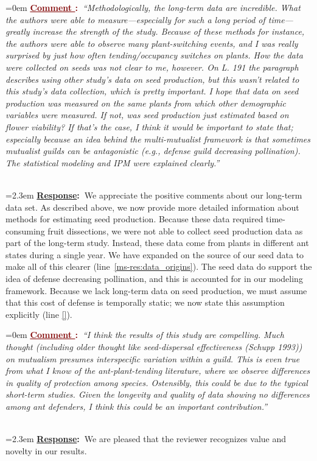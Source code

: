 \documentclass[12pt]{article}
\newcounter{cN}
\newcommand{\comment}[1]{
	\vspace{2em}
	\refstepcounter{cN} %
	\noindent \hangindent=0em \textbf{\textcolor{Maroon}{\uline{Comment \thecN}:~}}\emph{``#1''}
	}
\newcommand{\response}[1]{
	\\[0.25em]
	\hangindent=2.3em \textbf{\textcolor{NavyBlue}{\uline{Response}:~}}#1
	}
\begin{document}
\comment{Methodologically, the long-term data are incredible. 
What the authors were able to measure—especially for such a long period of time—greatly increase the strength of the study. 
Because of these methods for instance, the authors were able to observe many plant-switching events, and I was really surprised by just how often tending/occupancy switches on plants. 
How the data were collected on seeds was not clear to me, however. 
On L. 191 the paragraph describes using other study's data on seed production, but this wasn't related to this study's data collection, which is pretty important. 
I hope that data on seed production was measured on the same plants from which other demographic variables were measured. 
If not, was seed production just estimated based on flower viability?  
If that's the case, I think it would be important to state that; especially because an idea behind the multi-mutualist framework is that sometimes mutualist guilds can be antagonistic (e.g., defense guild decreasing pollination). 
The statistical modeling and IPM were explained clearly.}
\response{We appreciate the positive comments about our long-term data set. 
	As described above, we now provide more detailed information about methods for estimating seed production.
	Because these data required time-consuming fruit dissections, we were not able to collect seed production data as part of the long-term study. 
	Instead, these data come from plants in different ant states during a single year. 
	We have expanded on the source of our seed data to make all of this clearer (line~\ref{ms-res:data_origins}). 
	The seed data do support the idea of defense decreasing pollination, and this is accounted for in our modeling framework. 
	Because we lack long-term data on seed production, we must assume that this cost of defense is temporally static; we now state this assumption explicitly (line \ref{}).}

\comment{I think the results of this study are compelling. 
Much thought (including older thought like seed-dispersal effectiveness (Schupp 1993)) on mutualism presumes interspecific variation within a guild. 
This is even true from what I know of the ant-plant-tending literature, where we observe differences in quality of protection among species. 
Ostensibly, this could be due to the typical short-term studies. 
Given the longevity and quality of data showing no differences among ant defenders, I think this could be an important contribution.}
\response{We are pleased that the reviewer recognizes value and novelty in our results.}
\end{document}
